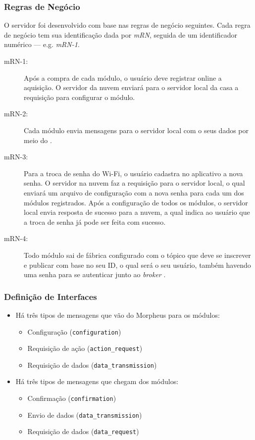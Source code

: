 \subsubsection{Regras de Negócio}
O servidor foi desenvolvido com base nas regras de negócio seguintes. Cada regra de negócio tem sua identificação dada por \emph{mRN}, seguida de um identificador numérico --- e.g. \emph{mRN-1}.
\begin{description}
\item[mRN-1:]Após a compra de cada módulo, o usuário deve registrar online a aquisição. O servidor da nuvem enviará para o servidor local da casa a requisição para configurar o módulo.
\item[mRN-2:]Cada módulo envia mensagens para o servidor local com o seus dados por meio do \wmqtt{}.
\item[mRN-3:]Para a troca de senha do Wi-Fi, o usuário cadastra no aplicativo a nova senha. O servidor na nuvem faz a requisição para o servidor local, o qual enviará um arquivo de configuração com a nova senha para cada um dos módulos registrados. Após a configuração de todos os módulos, o servidor local envia resposta de sucesso para a nuvem, a qual indica ao usuário que a troca de senha já pode ser feita com sucesso.
\item[mRN-4:]Todo módulo sai de fábrica configurado com o tópico que deve se inscrever e publicar com base no seu ID, o qual será o seu usuário, também havendo uma senha para se autenticar junto ao \emph{broker} \wmqtt{}.
\end{description}

\subsubsection{Definição de Interfaces}
\begin{itemize}
\item Há três tipos de mensagens que vão do Morpheus para os módulos:
  \begin{itemize}
  \item Configuração (\texttt{configuration})
  \item Requisição de ação (\texttt{action\_request})
  \item Requisição de dados (\texttt{data\_transmission})
  \end{itemize}
\item Há três tipos de mensagens que chegam dos módulos:
  \begin{itemize}
  \item Confirmação (\texttt{confirmation})
  \item Envio de dados (\texttt{data\_transmission})
  \item Requisição de dados (\texttt{data\_request})
  \end{itemize}
\end{itemize}

